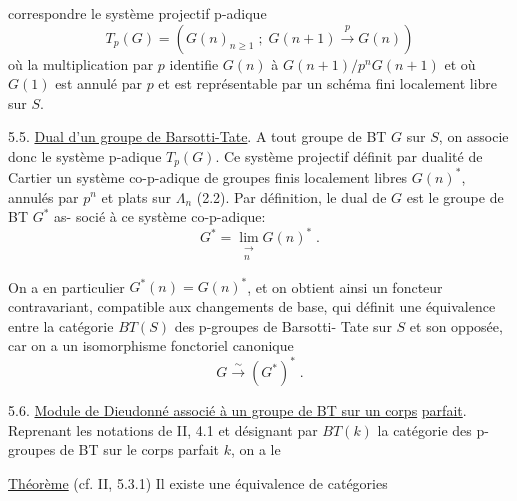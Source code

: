 
 correspondre  le système projectif p-adique
\[ T_p(G) = (G(n)_{n\geq 1} \; ; \; G(n+1) \xrightarrow{p} G(n)) \]
où la multiplication par $p$ identifie $G(n)$ à $G(n+1)/p^nG(n+1)$ et
où $G(1)$ est annulé par $p$ et est représentable par un schéma fini
localement libre sur $S$.

5.5. \uline{Dual d'un groupe de Barsotti-Tate}. A tout groupe de BT
$G$ sur $S$, on associe donc le système p-adique $T_p(G)$. Ce système
projectif définit par dualité de Cartier un système co-p-adique de
groupes finis localement libres $G(n)^*$, annulés par $p^n$ et plats sur
$\Lambda_n$ (2.2). Par définition, le dual de $G$ est le groupe de BT $G^*$ as-%
socié à ce système co-p-adique:
\[ G^* = \lim_{\substack{\rightarrow \\ n}} G(n)^* \; . \]

On a en particulier $G^*(n) = G(n)^*$, et on obtient ainsi un
foncteur contravariant, compatible aux changements de base, qui définit
une équivalence entre la catégorie $BT(S)$ des p-groupes de Barsotti-%
Tate sur $S$ et son opposée, car on a un isomorphisme fonctoriel canonique
\[ G \xrightarrow{\sim} (G^*)^* \; . \]

5.6. \uline{Module de Dieudonné associé à un groupe de BT sur un corps}
\uline{parfait}. Reprenant les notations de II, 4.1 et désignant par $BT(k)$
la catégorie des p-groupes de BT sur le corps parfait $k$, on a le

\uline{Théorème} (cf. II, 5.3.1) Il existe une équivalence de catégories

